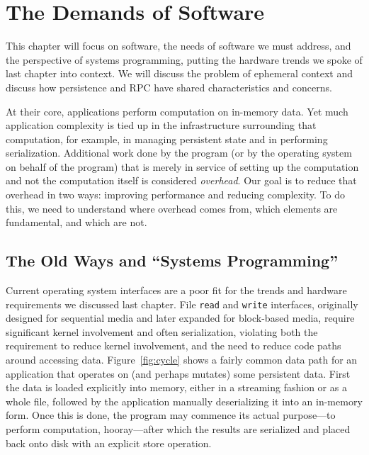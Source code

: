 
\chapter{The Demands of Software}\label{ch:softwaredemands}

\begin{chabstract}
    This chapter will focus on software, the needs of software we must address, and the perspective of systems
    programming, putting the hardware trends we spoke of last chapter into context. We will discuss the problem of
    ephemeral context and discuss how persistence and RPC have shared characteristics and concerns.
\end{chabstract}

At their core, applications perform computation on in-memory data. Yet much application complexity is tied up in the
infrastructure surrounding that computation, for example, in managing persistent state and in performing serialization.
Additional work done by the program (or by the operating system on behalf of the program) that is merely in service of
setting up the computation and not the computation itself is considered \emph{overhead}. Our goal is to
reduce that overhead in two ways: improving performance and reducing complexity. To do this, we need to understand where
overhead comes from, which elements are fundamental, and which are not.

\section{The Old Ways and ``Systems Programming''}

Current operating system interfaces are a poor fit for the trends and hardware requirements we discussed last chapter.
File \texttt{read} and \texttt{write} interfaces, originally designed for sequential media and later expanded for
block-based media, require significant kernel involvement and often serialization, violating both the requirement to reduce
kernel involvement, and the need to reduce code paths around accessing data. Figure~\ref{fig:cycle} shows a fairly
common data path for an application that operates on (and perhaps mutates) some persistent data. First the data is
loaded explicitly into memory, either in a streaming fashion or as a whole file, followed by the application manually
deserializing it into an in-memory form. Once this is done, the program may commence its actual purpose---to perform
computation, hooray---after which the results are serialized and placed back onto disk with an explicit store operation.


